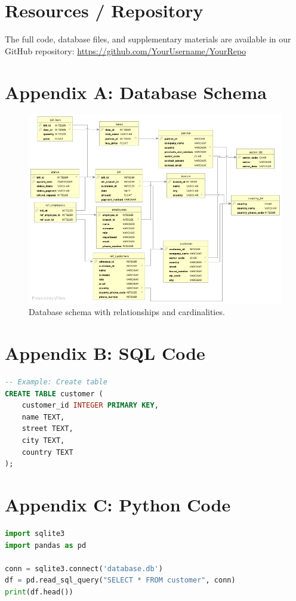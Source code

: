 \documentclass[12pt,a4paper]{article}
\begin{document}
\section{Resources / Repository}
The full code, database files, and supplementary materials are available in our GitHub repository:  
\href{https://github.com/YourUsername/YourRepo}{https://github.com/YourUsername/YourRepo}

\newpage
\appendix
\section{Appendix A: Database Schema}
\begin{figure}[h!]
    \centering
    \includegraphics[width=1.1\textwidth]{ERdiagram.jpg} %
    \caption{Database schema with relationships and cardinalities.}
    \label{fig:schema}
\end{figure}

\section{Appendix B: SQL Code}
\begin{lstlisting}[language=SQL]
-- Example: Create table
CREATE TABLE customer (
    customer_id INTEGER PRIMARY KEY,
    name TEXT,
    street TEXT,
    city TEXT,
    country TEXT
);
\end{lstlisting}

\section{Appendix C: Python Code}
\begin{lstlisting}[language=Python]
import sqlite3
import pandas as pd

conn = sqlite3.connect('database.db')
df = pd.read_sql_query("SELECT * FROM customer", conn)
print(df.head())
\end{lstlisting}
\end{document}
